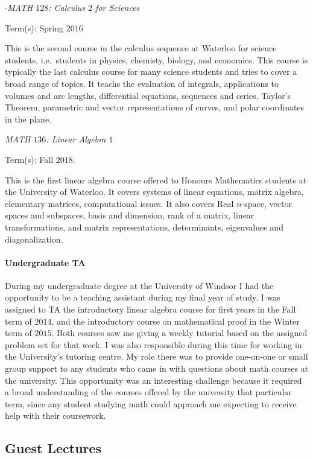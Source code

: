 \documentclass{article}
\begin{document}
\noindent$\cdot$\emph{MATH $128$: Calculus $2$ for Sciences}

Term(s): Spring $2016$

This is the second course in the calculus sequence at Waterloo for science students, i.e.\ students in physics, chemisty, biology, and economics. This course is typically the last calculus course for many science students and tries to cover a broad range of topics. It teachs the evaluation of integrals, applications to volumes and arc lengths, differential equations, sequences and series, Taylor's Theorem, parametric and vector representations of curves, and polar coordinates in the plane.

\noindent\emph{MATH $136$: Linear Algebra $1$}

Term(s): Fall $2018$.

This is the first linear algebra course offered to Honours Mathematics students at the University of Waterloo. It covers systems of linear equations, matrix algebra, elementary matrices, computational issues. It also covers Real $n$-space, vector spaces and subspaces, basis and dimension, rank of a matrix, linear transformations, and matrix representations, determinants, eigenvalues and diagonalization.

\paragraph{Undergraduate TA}During my undergraduate degree at the University of Windsor I had the opportunity to be a teaching assistant during my final year of study. I was assigned to TA the introductory linear algebra course for first years in the Fall term of $2014$, and the introductory course on mathematical proof in the Winter term of $2015$. Both courses saw me giving a weekly tutorial based on the assigned problem set for that week. I was also responsible during this time for working in the University's tutoring centre. My role there was to provide one-on-one or small group support to any students who came in with questions about math courses at the university. This opportunity was an interesting challenge because it required a broad understanding of the courses offered by the university that particular term, since any student studying math could approach me expecting to receive help with their coursework.

\subsection{Guest Lectures}
\end{document}
